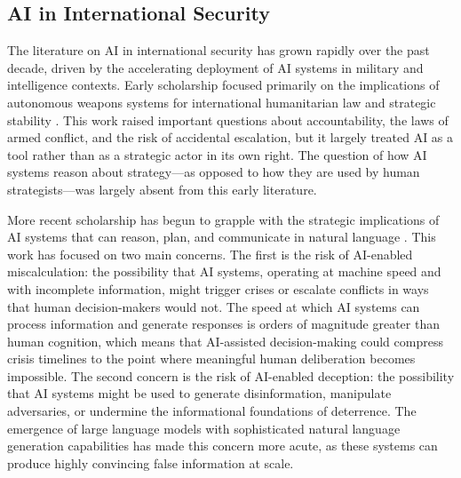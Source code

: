 \documentclass[12pt]{article}
\theoremstyle{plain}
\theoremstyle{definition}
\begin{document}
\subsection{AI in International Security}

The literature on AI in international security has grown rapidly over the past decade, driven by the accelerating deployment of AI systems in military and intelligence contexts. Early scholarship focused primarily on the implications of autonomous weapons systems for international humanitarian law and strategic stability \citep{Horowitz2016}. This work raised important questions about accountability, the laws of armed conflict, and the risk of accidental escalation, but it largely treated AI as a tool rather than as a strategic actor in its own right. The question of how AI systems reason about strategy---as opposed to how they are used by human strategists---was largely absent from this early literature.

More recent scholarship has begun to grapple with the strategic implications of AI systems that can reason, plan, and communicate in natural language \citep{Johnson2020}. This work has focused on two main concerns. The first is the risk of AI-enabled miscalculation: the possibility that AI systems, operating at machine speed and with incomplete information, might trigger crises or escalate conflicts in ways that human decision-makers would not. The speed at which AI systems can process information and generate responses is orders of magnitude greater than human cognition, which means that AI-assisted decision-making could compress crisis timelines to the point where meaningful human deliberation becomes impossible. The second concern is the risk of AI-enabled deception: the possibility that AI systems might be used to generate disinformation, manipulate adversaries, or undermine the informational foundations of deterrence. The emergence of large language models with sophisticated natural language generation capabilities has made this concern more acute, as these systems can produce highly convincing false information at scale.
\end{document}
